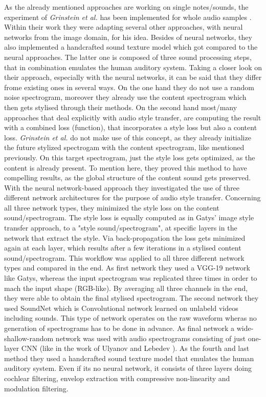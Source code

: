 
As the already mentioned approaches are working on single notes/sounds, the experiment of \textit{Grinstein et al.} has been implemented for whole audio samples \cite{Grinstein2018}. Within their work they were adapting several other approaches, with neural networks from the image domain, for his idea. Besides of neural networks, they also implemented a handcrafted sound texture model which got compared to the neural approaches. The latter one is composed of three sound processing steps, that in combination emulates the human auditory system. Taking a closer look on their approach, especially with the neural networks, it can be said that they differ frome existing ones in several ways. On the one hand they do not use a random noise spectrogram, moreover they already use the content spectrogram which then gets stylised through their methods. On the second hand most/many approaches that deal explicitly with audio style transfer, are computing the result with a combined loss (function), that incorporates a style loss but also a content loss. \textit{Grinstein et al.} do not make use of this concept, as they already initialize the future stylized spectrogam with the content spectrogram, like mentioned previously. On this target spectrogram, just the style loss gets optimized, as the content is already present. To mention here, they proved this method to have compelling results, as the global structure of the content sound gets preserved.\\
With the neural network-based approach they investigated the use of three different network architectures for the purpose of audio style transfer. Concerning all three network types, they minimized the style loss on the content sound/spectrogram. The style loss is equally computed as in Gatys' image style transfer approach, to a "style sound/spectrogram", at specific layers in the network that extract the style. Via back-propagation the loss gets minimized again at each layer, which results after a few iterations in a stylised content sound/spectrogram. This workflow was applied to all three different network types and compared in the end. As first network they used a VGG-19 network like Gatys, whereas the input spectrogram was replicated three times in order to mach the input shape (RGB-like). By averaging all three channels in the end, they were able to obtain the final stylised spectrogram. The second network they used SoundNet which is Convolutional network learned on unlabeld videos including sounds. This type of network operates on the raw waveform wheras no generation of spectrograms has to be done in advance. As final network a wide-shallow-random network was used with audio spectrograms consisting of just one-layer CNN (like in the work of Ulyanov and Lebedev \cite{ulyanov2016audio}). As the fourth and last method they used a handcrafted sound texture model that emulates the human auditory system. Even if its no neural network, it consists of three layers doing cochlear filtering, envelop extraction with compressive non-linearity and modulation filtering.\\
